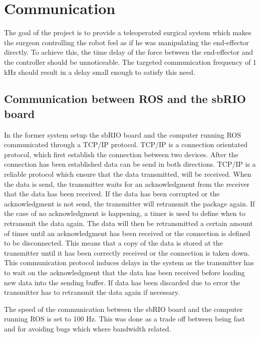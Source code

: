 \chapter{Communication}\label{cha:communication}

The goal of the project is to provide a teleoperated surgical system which makes the surgeon controlling the robot feel as if he was manipulating the end-effector directly. To achieve this, the time delay of the force between the end-effector and the controller should be unnoticeable. The targeted communication frequency of 1 kHz should result in a delay small enough to satisfy this need.

\section{Communication between ROS and the sbRIO board}

In the former system setup the sbRIO board and the computer running ROS communicated through a TCP/IP protocol. TCP/IP is a connection orientated protocol, which first establish the connection between two devices. After the connection has been established data can be send in both directions. TCP/IP is a reliable protocol which ensure that the data transmitted, will be received. When the data is send, the transmitter waits for an acknowledgment from the receiver that the data has been received. If the data has been corrupted or the acknowledgment is not send, the transmitter will retransmit the package again. If the case of no acknowledgment is happening, a timer is used to define when to retransmit the data again. The data will then be retransmitted a certain amount of times until an acknowledgment has been received or the connection is defined to be disconnected. This means that a copy of the data is stored at the transmitter until it has been correctly received or the connection is taken down.\\ 
This communication protocol induces delays in the system as the transmitter has to wait on the acknowledgment that the data has been received before loading new data into the sending buffer. If data has been discarded due to error the transmitter has to retransmit the data again if necessary.  

The speed of the communication between the sbRIO board and the computer running ROS is set to 100 Hz. This was done as a trade off between being fast and for avoiding bugs which where bandwidth related\cite{Chris_Surgical}.

